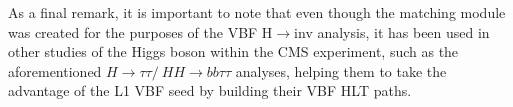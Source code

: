 \hspace{10pt} As a final remark, it is important to note that even though the matching module was created for the purposes of the VBF H$\rightarrow$inv analysis, it has been used in other studies of the Higgs boson within the CMS experiment, such as the aforementioned $H\rightarrow \tau\tau /~ HH\rightarrow bb\tau\tau$ analyses, helping them to take the advantage of the L1 VBF seed by building their VBF HLT paths.

 





\begin{center}
    \expandafter\pgfornament\expandafter{88}
\end{center}
\restoregeometry